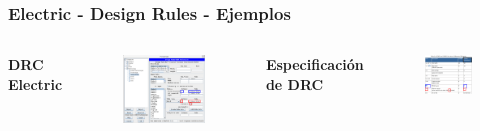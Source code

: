 \documentclass{beamer}
\begin{document}
\begin{frame}
\frametitle{Electric - Design Rules - Ejemplos}
\begin{columns}[c] %
\textbf{DRC Electric}
\begin{figure}
\includegraphics[width=0.99\linewidth]{figuras/configuracionElectric-8b.png}
\end{figure}
\textbf{Especificación de DRC}
\begin{figure}
\includegraphics[width=0.99\linewidth]{figuras/configuracionElectric-9.png}
\end{figure}
\end{columns}
\end{frame}
\end{document}
